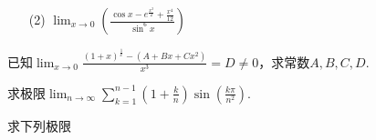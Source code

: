 \begin{xiti}
\begin{enumerate}
	\item[(2)] $\lim _ { x \rightarrow 0 } \left( \frac { \cos x - e ^ { \frac { x ^ { 2 } } { 2 } } + \frac { x ^ { 4 } } { 12 } } { \sin ^ { 6 } x } \right)$
\end{enumerate}
\item 已知$\lim _ { x \rightarrow 0 } \frac { ( 1 + x ) ^ { \frac { 1 } { x } } - \left( A + B x + C x ^ { 2 } \right) } { x ^ { 3 } } = D \neq 0$，求常数$A,B,C,D$.
\item 求极限$\lim _ { n \rightarrow \infty } \sum _ { k = 1 } ^ { n - 1 } \left( 1 + \frac { k } { n } \right) \sin \left( \frac { k \pi } { n ^ { 2 } } \right)$.
%	
%	
\item 求下列极限

\end{xiti}
